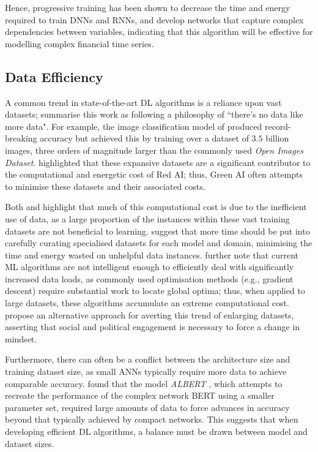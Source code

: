 \documentclass[a4paper, 11pt]{report}
\begin{document}
    Hence, progressive training has been shown to decrease the time and energy required to train DNNs and RNNs, and develop networks that capture complex dependencies between variables, indicating that this algorithm will be effective for modelling complex financial time series.


    \subsection{Data Efficiency}

    A common trend in state-of-the-art DL algorithms is a reliance upon vast datasets; \citet{bender-2021} summarise this work as following a philosophy of ``there's no data like more data". For example, the image classification model of \citet{mahajan-2018} produced record-breaking accuracy but achieved this by training over a dataset of $3.5$ billion images, three orders of magnitude larger than the commonly used \emph{Open Images Dataset}. \citet{schwartz-2019} highlighted that these expansive datasets are a significant contributor to the computational and energetic cost of Red AI; thus, Green AI often attempts to minimise these datasets and their associated costs.

    Both \citet{bender-2021} and \citet{walsh-2021} highlight that much of this computational cost is due to the inefficient use of data, as a large proportion of the instances within these vast training datasets are not beneficial to learning. \citet{bender-2021} suggest that more time should be put into carefully curating specialised datasets for each model and domain, minimising the time and energy wasted on unhelpful data instances. \citet{aljarrah-2015} further note that current ML algorithms are not intelligent enough to efficiently deal with significantly increased data loads, as commonly used optimisation methods (e.g., gradient descent) require substantial work to locate global optima; thus, when applied to large datasets, these algorithms accumulate an extreme computational cost. \citet{bietti-2019} propose an alternative approach for averting this trend of enlarging datasets, asserting that social and political engagement is necessary to force a change in mindset.
  

    Furthermore, there can often be a conflict between the architecture size and training dataset size, as small ANNs typically require more data to achieve comparable accuracy. \citet{bender-2021} found that the model \emph{ALBERT} \citep{lan-2020}, which attempts to recreate the performance of the complex network BERT using a smaller parameter set, required large amounts of data to force advances in accuracy beyond that typically achieved by compact networks. This suggests that when developing efficient DL algorithms, a balance must be drawn between model and dataset sizes.
\end{document}
